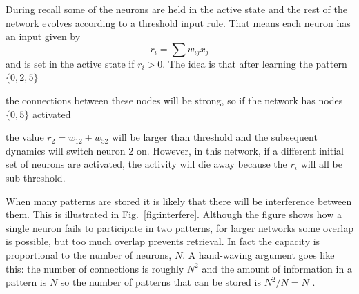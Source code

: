 \documentclass[12pt]{article}
\begin{document}
During recall some of the neurons are held in the active state and the
rest of the network evolves according to a threshold input rule. That
means each neuron has an input given by
\begin{equation}
r_i=\sum{w_{ij}x_j}
\end{equation}
and is set in the active state if $r_i>0$. The idea is that after
learning the pattern $\{0,2,5\}$
\begin{center}
\end{center}
the connections between these nodes will be strong, so if the network has nodes $\{0,5\}$ activated
\begin{center}
\end{center}
the value $r_{2}=w_{12}+w_{52}$ will be larger than threshold and the
subsequent dynamics will switch neuron 2 on. However, in this network,
if a different initial set of neurons are activated, the activity will
die away because the $r_i$ will all be sub-threshold.

When many patterns are stored it is likely that there will be
interference between them. This is illustrated in
Fig.~\ref{fig:interfere}. Although the figure shows how a single
neuron fails to participate in two patterns, for larger networks some
overlap is possible, but too much overlap prevents retrieval. In fact
the capacity is proportional to the number of neurons, $N$. A
hand-waving argument goes like this: the number of connections is
roughly $N^2$ and the amount of information in a pattern is $N$ so the
number of patterns that can be stored is $N^2/N=N$ \cite{Amit1992a}.
\end{document}
